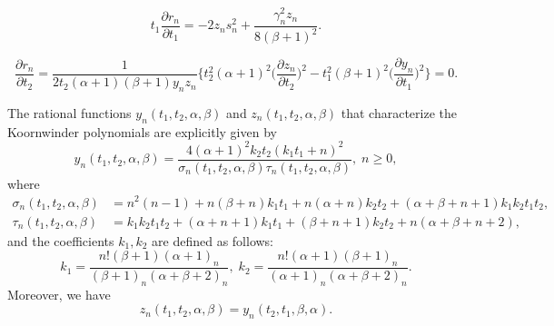 \documentclass[10pt,a4paper]{amsart}
\begin{document}
\begin{equation}
t_1\frac{\partial r_n}{\partial t_1}=-2z_ns_n^2+\frac{\gamma_n^2 z_n}{8(\beta+1)^2}.\label{drt1}
\end{equation}

\begin{equation}
\frac{\partial r_n}{\partial t_2}=\frac{1}{2t_2(\alpha+1)(\beta+1)y_nz_n}\Big\{t_2^2(\alpha+1)^2\Big(\frac{\partial z_n}{\partial t_2}\Big)^2-t_1^2(\beta+1)^2\Big(\frac{\partial y_n}{\partial t_1}\Big)^2\Big\}=0.\label{drt2}
\end{equation}

\begin{theorem} \label{theorem 5.2}
The rational functions $y_n(t_1,t_2,\alpha,\beta)$ and $z_n(t_1,t_2,\alpha,\beta)$ that characterize the Koornwinder polynomials are explicitly given by
\begin{equation} 
y_n(t_1,t_2,\alpha,\beta)=\frac{4(\alpha+1)^2k_2t_2(k_1t_1+n)^2}{\sigma_n(t_1,t_2,\alpha,\beta)\tau_n(t_1,t_2,\alpha,\beta)},\; n\geq 0,\label{Ky}
\end{equation}
where 
\begin{align}
\sigma_n(t_1,t_2,\alpha,\beta)&=n^2(n-1)+n(\beta+n)k_1t_1+n(\alpha+n)k_2t_2
+(\alpha+\beta+n+1)k_1k_2t_1t_2,\nonumber\\
\tau_n(t_1,t_2,\alpha,\beta)&=k_1k_2t_1t_2+(\alpha+n+1)k_1t_1+(\beta+n+1)k_2t_2
+n(\alpha+\beta+n+2),\label{Ksigmatau}
\end{align}
and the coefficients $k_1, k_2$ are defined as follows:
\begin{equation} \label{k1k2}
k_1=\frac{n!(\beta+1)(\alpha+1)_n}{(\beta+1)_n(\alpha+\beta+2)_n},\; k_2=\frac{n!(\alpha+1)(\beta+1)_n}{(\alpha+1)_n(\alpha+\beta+2)_n}.
\end{equation}
Moreover, we have
\begin{equation}
z_n(t_1,t_2,\alpha,\beta)=y_n(t_2,t_1,\beta,\alpha).\label{Kz}
\end{equation}
\end{theorem}
\end{document}
